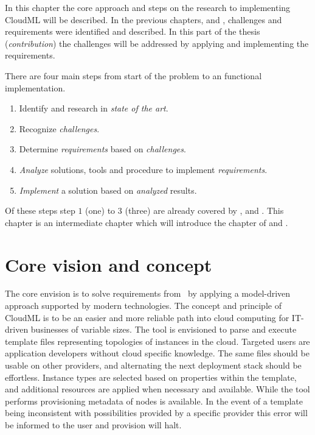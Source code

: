 %

In this chapter the core approach and steps on the research to implementing CloudML will be described.
In the previous chapters,  and , 
challenges and requirements were identified and described.
In this part of the thesis (\emph{contribution}) the challenges will be addressed 
by applying and implementing the requirements.

There are four main steps from start of the problem to an functional implementation.
\begin{enumerate}
  \item Identify and research in \emph{state of the art}.
  \item Recognize \emph{challenges}.
  \item Determine \emph{requirements} based on \emph{challenges}.
  \item \emph{Analyze} solutions, tools and procedure to implement \emph{requirements}.
  \item \emph{Implement} a solution based on \emph{analyzed} results.
\end{enumerate}
Of these steps step $1$ (one) to $3$ (three) are already covered by 
,  and .
This chapter is an intermediate chapter which will introduce the chapter of 
and .

\section{Core vision and concept}


The core envision is to solve requirements from~ by applying a 
model-driven approach supported by modern technologies.
The concept and principle of CloudML is to be an easier and more reliable
path into cloud computing for IT-driven businesses of variable sizes.
The tool is envisioned to parse and execute template files representing topologies
of instances in the cloud. 
Targeted users are application developers without cloud specific knowledge. 
The same files should be usable on other providers,
and alternating the next deployment stack should be effortless.
Instance types are selected based on properties within the template,
and additional resources are applied when necessary and available.
While the tool performs provisioning metadata of nodes is available.
In the event of a template being inconsistent with possibilities 
provided by a specific provider this error will be informed 
to the user and provision will halt.


